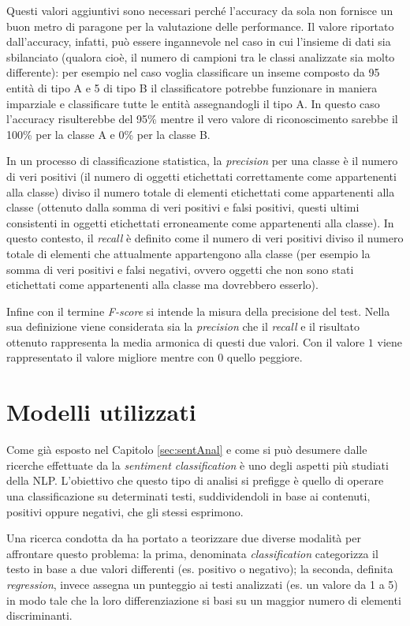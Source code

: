 \documentclass[a4paper,12pt,openright,twoside]{report}
\theoremstyle{definition}
\begin{document}
Questi valori aggiuntivi sono necessari perché l'accuracy da sola non fornisce un buon metro di paragone
per la valutazione delle performance. Il valore riportato dall'accuracy, infatti, può essere ingannevole
nel caso in cui l'insieme di dati sia sbilanciato (qualora cioè, il numero di campioni tra le classi analizzate
sia molto differente): per esempio nel caso voglia classificare un inseme composto da 95 entità di tipo A
e 5 di tipo B il classificatore potrebbe funzionare in maniera imparziale e classificare tutte le entità 
assegnandogli il tipo A. In questo caso l'accuracy risulterebbe del 95\% mentre il vero valore di riconoscimento
 sarebbe il 100\% per la classe A e 0\% per la classe B.

In un processo di classificazione statistica, la \emph{precision} per una classe è il numero di 
veri positivi (il numero di oggetti etichettati correttamente come appartenenti alla classe) 
diviso il numero totale di elementi etichettati come appartenenti alla classe 
(ottenuto dalla somma di veri positivi e falsi positivi, 
questi ultimi consistenti in oggetti etichettati erroneamente 
come appartenenti alla classe). In questo contesto, il \emph{recall} è definito come il numero 
di veri positivi diviso il numero totale di elementi che attualmente appartengono alla classe 
(per esempio la somma di veri positivi e falsi negativi, ovvero oggetti che non 
sono stati etichettati come appartenenti alla classe ma dovrebbero esserlo).

Infine con il termine \emph{F-score} si intende la misura della precisione del test. Nella sua
definizione viene considerata sia la \emph{precision} che il \emph{recall} e il risultato ottenuto rappresenta
la media armonica di questi due valori. Con il valore $1$ viene rappresentato il valore migliore
mentre con 0 quello peggiore.

\section{Modelli utilizzati}
Come già esposto nel Capitolo \ref{sec:sentAnal} e come si può desumere
dalle ricerche effettuate da \cite{Pang2008}
la \emph{sentiment classification} è uno degli aspetti più studiati della NLP.
L’obiettivo che questo tipo di analisi si prefigge è quello di operare una classificazione su determinati testi, 
suddividendoli in base ai contenuti, positivi oppure negativi, che gli stessi esprimono. 

Una ricerca condotta da 
\cite{Zhai2010}
ha portato a teorizzare due diverse modalità per affrontare questo problema: la prima, denominata
 \emph{classification}
categorizza il testo in base a due valori differenti (es. positivo o negativo); la seconda, definita 
\emph{regression}, invece assegna un punteggio ai testi analizzati (es. un valore da 1 a 5)
in modo tale che la loro differenziazione si basi su un maggior numero di elementi discriminanti.
\end{document}
